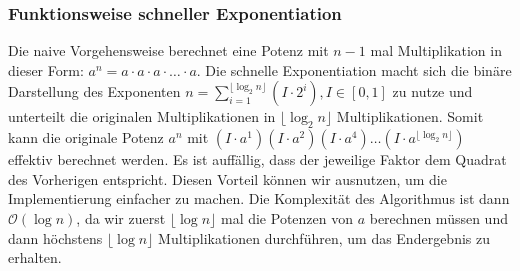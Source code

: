 \documentclass[course=erap]{aspdoc}
\begin{document}
\subsubsection{Funktionsweise schneller Exponentiation}
Die naive Vorgehensweise berechnet eine Potenz mit $n-1$ mal Multiplikation in dieser Form: $a^{n} = a \cdot a \cdot a \cdot \ldots \cdot a$. Die schnelle Exponentiation macht sich die binäre Darstellung des Exponenten $n = \sum_{i=1}^{\lfloor \log_2 n \rfloor} (I \cdot 2^i), I \in [0, 1]$ zu nutze und unterteilt die originalen Multiplikationen in $\lfloor \log_2 n \rfloor$ Multiplikationen. Somit kann die originale Potenz $a^n$ mit $(I \cdot a^1) (I \cdot a^2) (I \cdot a^4) \ldots (I \cdot a^{\lfloor \log_2 n \rfloor})$ effektiv berechnet werden. Es ist auffällig, dass der jeweilige Faktor dem Quadrat des Vorherigen entspricht. Diesen Vorteil können wir ausnutzen, um die Implementierung einfacher zu machen. Die Komplexität des Algorithmus ist dann $\mathcal{O}(\log n)$, da wir zuerst $\lfloor \log n \rfloor$ mal die Potenzen von $a$ berechnen müssen und dann höchstens $\lfloor \log n \rfloor$ Multiplikationen durchführen, um das Endergebnis zu erhalten. 
\end{document}
